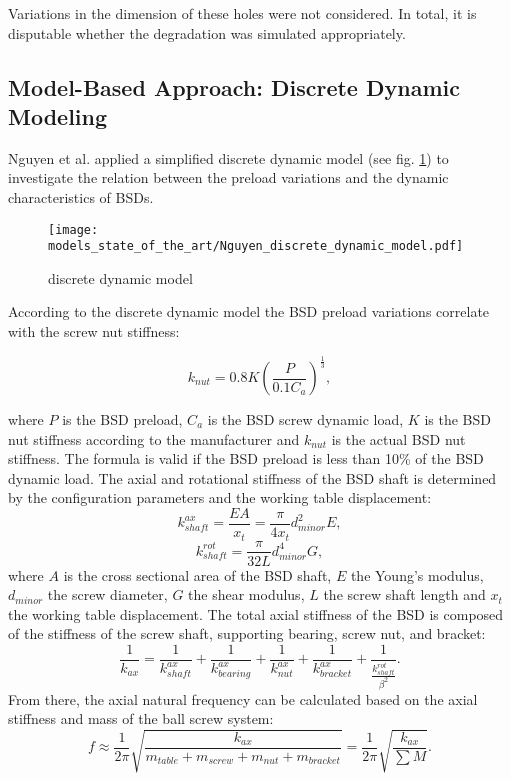 Variations in the dimension of these holes were not considered. In total, it is disputable whether the degradation was simulated appropriately.  

\subsection{Model-Based Approach: Discrete Dynamic Modeling}
Nguyen et al. \cite{NGUYEN2019} applied a simplified discrete dynamic model (see fig. \ref{fig:Nguyen_discrete_dynamic_model}) to investigate the relation between the preload variations and the dynamic characteristics of BSDs.

\begin{figure}[H]
  \centering
  \texttt{[image: models\_state\_of\_the\_art/Nguyen\_discrete\_dynamic\_model.pdf]}
  \caption{discrete dynamic model \cite{NGUYEN2019}}
  \label{fig:Nguyen_discrete_dynamic_model}
\end{figure}

According to the discrete dynamic model the BSD preload variations correlate with the screw nut stiffness:

\begin{equation}
    k_{nut}=0.8K(\frac{P}{0.1C_{a}})^{\frac{1}{3}},
\end{equation}

where $P$ is the BSD preload, $C_{a}$ is the BSD screw dynamic load, $K$ is the BSD nut stiffness according to the manufacturer and $k_{nut}$ is the actual BSD nut stiffness. The formula is valid if the BSD preload is less than 10\% of the BSD dynamic load. The axial and rotational stiffness of the BSD shaft is determined by the configuration parameters and the working table displacement:
\begin{equation}
    k_{shaft}^{ax}=\frac{EA}{x_{t}}=\frac{\pi}{4x_{t}}d_{minor}^{2}E,
\end{equation}
\begin{equation}
    k_{shaft}^{rot}=\frac{\pi}{32L}d_{minor}^{4}G,
\end{equation}
 where $A$ is the cross sectional area of the BSD shaft, $E$ the Young’s modulus, $d_{minor}$ the screw diameter, $G$ the shear modulus, $L$ the screw shaft length and $x_{t}$ the working table displacement. The total axial stiffness of the BSD is composed of the stiffness of the screw shaft, supporting bearing, screw nut, and bracket:
 \begin{equation}
    \frac{1}{k_{ax}}=\frac{1}{k_{shaft}^{ax}}+\frac{1}{k_{bearing}^{ax}}+\frac{1}{k_{nut}^{ax}}+\frac{1}{k_{bracket}^{ax}}+\frac{1}{\frac{k_{shaft}^{rot}}{\beta^{2}}}.
\end{equation}
From there, the axial natural frequency can be calculated based on the axial stiffness and mass of the ball screw system:
\begin{equation}
    f\approx\frac{1}{2\pi}\sqrt{\frac{k_{ax}}{m_{table}+m_{screw}+m_{nut}+m_{bracket}}}=\frac{1}{2\pi}\sqrt{\frac{k_{ax}}{\sum M}}.
\end{equation}

